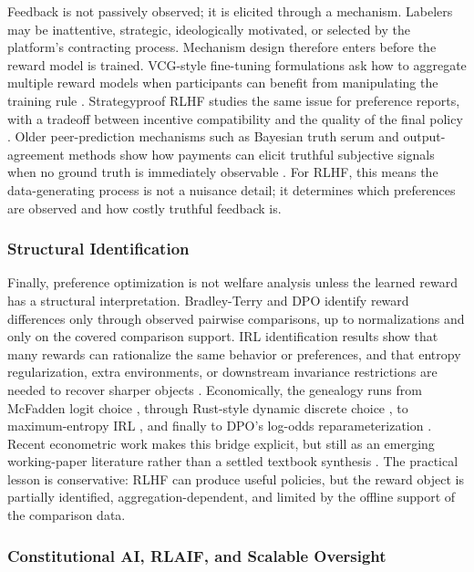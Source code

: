 Feedback is not passively observed; it is elicited through a mechanism. Labelers may be inattentive, strategic, ideologically motivated, or selected by the platform's contracting process. Mechanism design therefore enters before the reward model is trained. VCG-style fine-tuning formulations ask how to aggregate multiple reward models when participants can benefit from manipulating the training rule \citep{sun2024mechanism}. Strategyproof RLHF studies the same issue for preference reports, with a tradeoff between incentive compatibility and the quality of the final policy \citep{kleinebuening2025strategyproof}. Older peer-prediction mechanisms such as Bayesian truth serum and output-agreement methods show how payments can elicit truthful subjective signals when no ground truth is immediately observable \citep{prelec2004bayesian,miller2005eliciting}. For RLHF, this means the data-generating process is not a nuisance detail; it determines which preferences are observed and how costly truthful feedback is.

\subsubsection{Structural Identification}

Finally, preference optimization is not welfare analysis unless the learned reward has a structural interpretation. Bradley-Terry and DPO identify reward differences only through observed pairwise comparisons, up to normalizations and only on the covered comparison support. IRL identification results show that many rewards can rationalize the same behavior or preferences, and that entropy regularization, extra environments, or downstream invariance restrictions are needed to recover sharper objects \citep{cao2021identifiability,skalse2023invariance,knox2022preference}. Economically, the genealogy runs from McFadden logit choice \citep{mcfadden:1973}, through Rust-style dynamic discrete choice \citep{rust1994structural,rust1996numerical}, to maximum-entropy IRL \citep{Ziebart2008}, and finally to DPO's log-odds reparameterization \citep{rafailov2023direct}. Recent econometric work makes this bridge explicit, but still as an emerging working-paper literature rather than a settled textbook synthesis \citep{vanderlaan2025efficient}. The practical lesson is conservative: RLHF can produce useful policies, but the reward object is partially identified, aggregation-dependent, and limited by the offline support of the comparison data.

\subsubsection{Constitutional AI, RLAIF, and Scalable Oversight}

